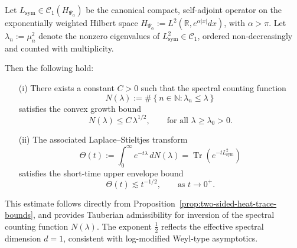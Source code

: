 \begin{lemma}
\label{lem:spectral_convexity_estimate}
Let \( L_{\mathrm{sym}} \in \mathcal{C}_1(H_{\Psi_\alpha}) \) be the canonical compact, self-adjoint operator on the exponentially weighted Hilbert space \( H_{\Psi_\alpha} := L^2(\mathbb{R}, e^{\alpha |x|} dx) \), with \( \alpha > \pi \). Let \( \lambda_n := \mu_n^2 \) denote the nonzero eigenvalues of \( L_{\mathrm{sym}}^2 \in \mathcal{C}_1 \), ordered non-decreasingly and counted with multiplicity.

Then the following hold:
\begin{enumerate}
  \item[\textnormal{(i)}] There exists a constant \( C > 0 \) such that the spectral counting function
  \[
  N(\lambda) := \#\left\{ n \in \mathbb{N} : \lambda_n \le \lambda \right\}
  \]
  satisfies the convex growth bound
  \[
  N(\lambda) \le C\, \lambda^{1/2}, \qquad \text{for all } \lambda \ge \lambda_0 > 0.
  \]

  \item[\textnormal{(ii)}] The associated Laplace–Stieltjes transform
  \[
  \Theta(t) := \int_0^\infty e^{-t\lambda}\, dN(\lambda)
  = \operatorname{Tr}(e^{-t L_{\mathrm{sym}}^2})
  \]
  satisfies the short-time upper envelope bound
  \[
  \Theta(t) \lesssim t^{-1/2}, \qquad \text{as } t \to 0^+.
  \]
\end{enumerate}

\noindent
This estimate follows directly from Proposition~\ref{prop:two-sided-heat-trace-bounds}, and provides Tauberian admissibility for inversion of the spectral counting function \( N(\lambda) \). The exponent \( \frac{1}{2} \) reflects the effective spectral dimension \( d = 1 \), consistent with log-modified Weyl-type asymptotics.
\end{lemma}
